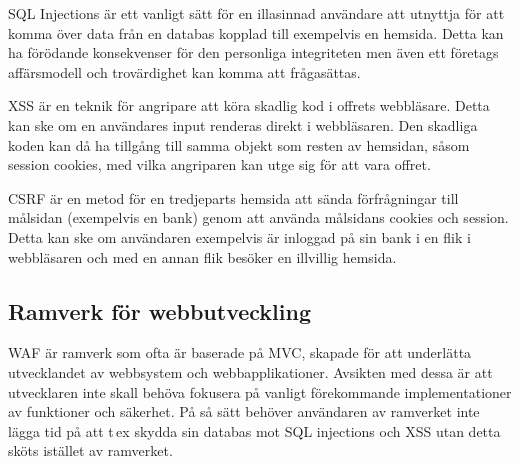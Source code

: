 SQL Injections är ett vanligt sätt för en illasinnad användare att utnyttja för att komma över data från en databas kopplad till exempelvis en hemsida. Detta kan ha förödande konsekvenser för den personliga integriteten men även ett företags affärsmodell och trovärdighet kan komma att frågasättas.


\ac{XSS} är en teknik för angripare att köra skadlig kod i offrets webbläsare. Detta kan ske om en användares input renderas direkt i webbläsaren. Den skadliga koden kan då ha tillgång till samma objekt som resten av hemsidan, såsom session cookies, med vilka angriparen kan utge sig för att vara offret.

\ac{CSRF} är en metod för en tredjeparts hemsida att sända förfrågningar till målsidan (exempelvis en bank) genom att använda målsidans cookies och session. Detta kan ske om användaren exempelvis är inloggad på sin bank i en flik i webbläsaren och med en annan flik besöker en illvillig hemsida.
\subsection{Ramverk för webbutveckling}


\ac{WAF} är ramverk som ofta är baserade på \ac{MVC}, skapade för att underlätta utvecklandet av webbsystem\cite{waf} och webbapplikationer. Avsikten med dessa är att utvecklaren inte skall behöva fokusera på vanligt förekommande implementationer av funktioner och säkerhet. På så sätt behöver användaren av ramverket inte lägga tid på att t\,ex skydda sin databas mot SQL injections och \ac{XSS} utan detta sköts istället av ramverket.
